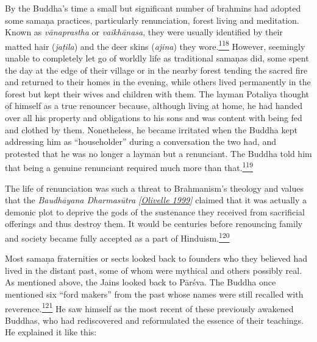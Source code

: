 By the Buddha's time a small but significant number of brahmins had
adopted some samaṇa practices, particularly renunciation, forest living
and meditation. Known as \emph{vānaprastha} or \emph{vaikhānasa}, they
were usually identified by their matted hair (\emph{jaṭila}) and the
deer skins (\emph{ajina}) they
wore.\label{footprints_split_007.html_fnref118}\hyperref[footprints_split_024.htmlux5cux23fn118]{\textsuperscript{118}}
However, seemingly unable to completely let go of worldly life as
traditional samaṇas did, some spent the day at the edge of their village
or in the nearby forest tending the sacred fire and returned to their
homes in the evening, while others lived permanently in the forest but
kept their wives and children with them. The layman Potaliya thought of
himself as a true renouncer because, although living at home, he had
handed over all his property and obligations to his sons and was content
with being fed and clothed by them. Nonetheless, he became irritated
when the Buddha kept addressing him as ``householder'' during a
conversation the two had, and protested that he was no longer a layman
but a renunciant. The Buddha told him that being a genuine renunciant
required much more than
that.\label{footprints_split_007.html_fnref119}\hyperref[footprints_split_024.htmlux5cux23fn119]{\textsuperscript{119}}

The life of renunciation was such a threat to Brahmanism's theology and
values that the \emph{{Baudhāyana Dharmasūtra
{{[}\hyperref[footprints_split_022.htmlux5cux23Olivelleux5cux25201999]{Olivelle
1999}{]}}}} claimed that it was actually a demonic plot to deprive the
gods of the sustenance they received from sacrificial offerings and thus
destroy them. It would be centuries before renouncing family and society
became fully accepted as a part of
Hinduism.\label{footprints_split_007.html_fnref120}\hyperref[footprints_split_024.htmlux5cux23fn120]{\textsuperscript{120}}

Most samaṇa fraternities or sects looked back to founders who they
believed had lived in the distant past, some of whom were mythical and
others possibly real. As mentioned above, the Jains looked back to
Pārśva. The Buddha once mentioned six ``ford makers'' from the past
whose names were still recalled with
reverence.\label{footprints_split_007.html_fnref121}\hyperref[footprints_split_024.htmlux5cux23fn121]{\textsuperscript{121}}
He saw himself as the most recent of these previously awakened Buddhas,
who had rediscovered and reformulated the essence of their teachings. He
explained it like this:

